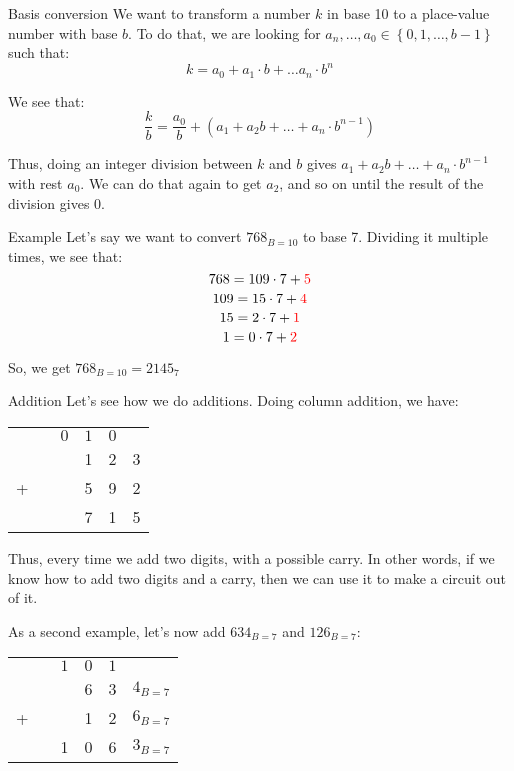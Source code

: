 \documentclass[a4paper]{article}
\begin{document}
\begin{parag}{Basis conversion}
    We want to transform a number $k$ in base 10 to a place-value number with base $b$. To do that, we are looking for $a_n, \ldots, a_0 \in \left\{0, 1, \ldots, b - 1\right\}$ such that: 
    \[k = a_0 + a_1 \cdot b + \ldots a_n \cdot b^n\]
    
    We see that:
    \[\frac{k}{b} = \frac{a_0}{b} + \left(a_1 + a_2 b + \ldots + a_n \cdot b^{n-1}\right) \]

    Thus, doing an integer division between $k$ and $b$ gives $a_1 + a_2 b + \ldots + a_n \cdot b^{n-1}$ with rest $a_0$. We can do that again to get $a_2$, and so on until the result of the division gives 0.

    \begin{subparag}{Example}
        Let's say we want to convert $768_{B=10}$ to base 7. Dividing it multiple times, we see that: 
        \[768 = 109\cdot 7 + {\color{red}5}\]
        \[109 = 15\cdot 7 + {\color{red}4}\]
        \[15 = 2\cdot 7 + {\color{red}1}\]
        \[1 = 0\cdot 7 + {\color{red}2}\]

        So, we get $768_{B=10} = 2145_7$
    \end{subparag}
    
\end{parag}


\begin{parag}{Addition}
    Let's see how we do additions. Doing column addition, we have:
    \begin{center}
    \begin{tabular}{r@{\,}r@{\,}r@{\,}r@{\,}r@{\,}r@{\,}}
        & & \tiny$0$ & \tiny$1$ & \tiny$0$ & \\
        & & & 1 & 2 & 3  \\
        + & & & 5 & 9 & 2  \\
        \hline
        & & & 7 & 1 & 5
    \end{tabular}
    \end{center}

    Thus, every time we add two digits, with a possible carry. In other words, if we know how to add two digits and a carry, then we can use it to make a circuit out of it.

    As a second example, let's now add $634_{B=7}$ and $126_{B=7}$:
    \begin{center}
    \begin{tabular}{r@{\,}r@{\,}r@{\,}r@{\,}r@{\,}r@{\,}}
        & & \tiny$1$ & \tiny$0$ & \tiny$1$ & \\
        & & & 6 & 3 & $4_{B=7}$  \\
        + & & & 1 & 2 & $6_{B=7}$  \\
        \hline
        & & 1 & 0 & 6 & $3_{B=7}$
    \end{tabular}
    \end{center}
\end{parag}
\end{document}
